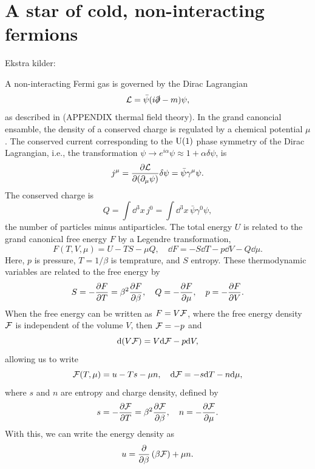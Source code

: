 \section{A star of cold, non-interacting fermions}
Ekstra kilder: \autocite{andersenIntroductionStatisticalMechanics2012,glendenningCompactStarsNuclear2012}

A non-interacting Fermi gas is governed by the Dirac Lagrangian
%
\begin{equation}
    \mathcal{L} = \bar \psi (i \slashed \partial - m) \psi,
\end{equation}
%
as described in (APPENDIX thermal field theory).
In the grand canoncial ensamble, the density of a conserved charge is regulated by a chemical potential $\mu$.
The conserved current corresponding to the $\text U(1)$ phase symmetry of the Dirac Lagrangian, i.e., the transformation $\psi \rightarrow e^{i \alpha} \psi \approx 1 + \alpha \delta \psi$, is
\begin{equation}
    j^\mu = \diffp{\Ell}{(\partial_\mu \psi)} \delta \psi = \bar \psi \gamma^\mu \psi.
\end{equation}
%
The conserved charge is
%
\begin{equation}
    Q = \int \dd^3 x \, j^0 = \int \dd^3 x\, \bar \psi \gamma^0 \psi,
\end{equation}
%
the number of particles minus antiparticles.
The total energy $U$ is related to the grand canonical free energy $F$ by a Legendre transformation,
%
\begin{equation}
    F(T, V, \mu) = U - T S - \mu Q, \quad \dd F = - S \dd T - p \dd V - Q \dd \mu.
\end{equation}
%
Here, $p$ is pressure, $T = {1}/{\beta}$ is temprature, and $S$ entropy.
These thermodynamic variables are related to the free energy by
%
\begin{equation}
    S = - \diffp{F}{T} = \beta^2 \diffp{F}{\beta}, \quad
    Q = - \diffp{F}{\mu}, \quad
    p = - \diffp{F}{V}.
\end{equation}
%
When the free energy can be written as $F = V \mathcal{F}$, where the free energy density $\mathcal{F}$ is independent of the volume $V$, then $\mathcal{F} = - p$ and
%
\begin{equation}
    \text{d} (V \mathcal{F}) = V \text{d} \mathcal{F} - p \text{d} V,
\end{equation}
%
allowing us to write
%
\begin{equation}
    \mathcal{F}(T, \mu) = u - Ts - \mu n, \quad
    \text{d} \mathcal{F} = -s \text{d} T - n \text{d} \mu,
\end{equation}
% 
where $s$ and $n$ are entropy and charge density, defined by
%
\begin{equation}
    s = - \diffp{\Eff}{T} = \beta^2 \diffp{\Eff}{\beta}, \quad
    n = - \diffp{\Eff}{\mu}.
\end{equation}
%
With this, we can write the energy density as
%
\begin{equation}
    u = \diffp{}{\beta} \left(\beta \Eff\right) + \mu n.
\end{equation}




